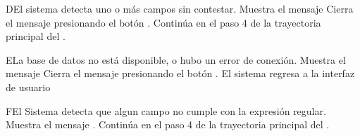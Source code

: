 \begin{UCtrayectoriaA}{D}{El sistema detecta uno o más campos sin contestar.}
	\UCpaso Muestra el mensaje 
	\UCpaso[\UCactor] Cierra el mensaje presionando el botón .
    \UCpaso Continúa en el paso 4 de la trayectoria principal del .
\end{UCtrayectoriaA}
\begin{UCtrayectoriaA}{E}{La base de datos no está disponible, o hubo un error de conexión.}
	\UCpaso Muestra el mensaje 
	\UCpaso[\UCactor] Cierra el mensaje presionando el botón .
	\UCpaso El sistema regresa a la interfaz de usuario 
\end{UCtrayectoriaA}
\begin{UCtrayectoriaA}{F}{El Sistema detecta que algun campo no cumple con la expresión regular.}
	\UCpaso Muestra el mensaje .
	\UCpaso Continúa en el paso 4 de la trayectoria principal del .
\end{UCtrayectoriaA}